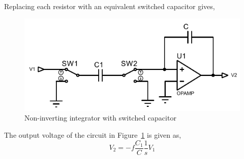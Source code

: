Replacing each resistor with an equivalent switched capacitor gives,
\begin{figure}[H]
    \centering
    \includegraphics{../Figures/int-non}
    \caption{Non-inverting integrator with switched capacitor}
    \label{fig:int-non-cap}
\end{figure}
The output voltage of the circuit in Figure~\ref{fig:int-non-cap} is given as,
\begin{equation}
    V_2=-f\frac{C_1}{C}\frac{1}{s}V_1
\end{equation}